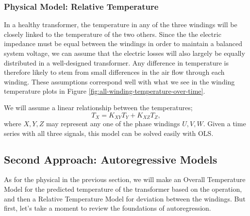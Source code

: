 \documentclass[]{article}
\begin{document}
\subsubsection{Physical Model: Relative Temperature} \label{sec:physical-model-relative}
In a healthy transformer, the temperature in any of the three windings will be closely linked to the temperature of the two others. Since the the electric impedance must be equal between the windings in order to maintain a balanced system voltage, we can assume that the electric losses will also largely be equally distributed in a well-designed transformer. Any difference in temperature is therefore likely to stem from small differences in the air flow through each winding. These assumptions correspond well with what we see in the winding temperature plots in Figure \ref{fig:all-winding-temperature-over-time}.

We will assume a linear relationship between the temperatures;
\begin{equation} \label{eq:physical-relative}
	T_X = K_{XY} T_Y + K_{XZ} T_Z,
\end{equation}
where $X,Y,Z$ may represent any one of the phase windings $U,V,W$. Given a time series with all three signals, this model can be solved easily with OLS.

\subsection{Second Approach: Autoregressive Models} \label{sec:autoregressive-model}
As for the physical in the previous section, we will make an Overall Temperature Model for the predicted temperature of the transformer based on the operation, and then a Relative Temperature Model for deviation between the windings. But first, let's take a moment to review the foundations of autoregression.
\end{document}

